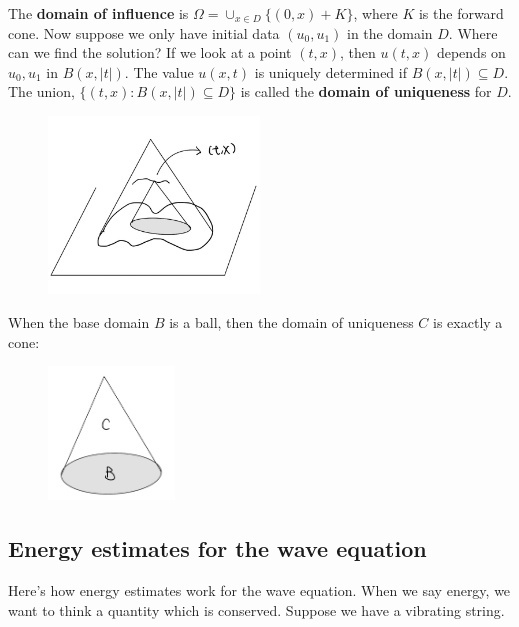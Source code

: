 The \textbf{domain of influence} is $\Omega=\cup_{x \in D}\{(0, x)+K\}$, where $K$ is the forward cone. Now suppose we only have initial data $\left(u_{0}, u_{1}\right)$ in the domain $D .$ Where can we find the solution? If we look at a point $(t, x)$, then $u(t, x)$ depends on $u_{0}, u_{1}$ in $B(x,|t|)$. The value $u(x, t)$ is uniquely determined if $B(x,|t|) \subseteq D$. The union, $\{(t, x): B(x,|t|) \subseteq D\}$ is called the \textbf{domain of uniqueness} for $D$.

\begin{figure}[H]
    \centering
    \includegraphics[width=0.5\textwidth]{Pics/25-3.png}
\end{figure}

\begin{example}
When the base domain $B$ is a ball, then the domain of uniqueness $C$ is exactly a cone:
\begin{figure}[H]
    \centering 
    \includegraphics[width=0.3\textwidth]{Pics/25-4.png}
\end{figure}
\end{example}

\subsection{Energy estimates for the wave equation}

Here's how energy estimates work for the wave equation. When we say energy, we want to think a quantity which is conserved. Suppose we have a vibrating string.

